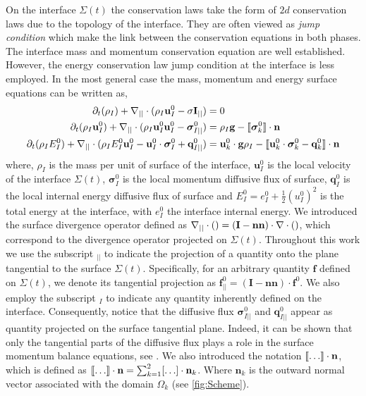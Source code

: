 On the interface $\Sigma(t)$ the conservation laws take the form of $2d$ conservation laws due to the topology of the interface. 
They are often viewed as \textit{jump condition} which make the link between the conservation equations in both phases. 
The interface mass and momentum conservation equation are well established.
However, the energy conservation law jump condition at the interface is less employed.
In the most general case the mass, momentum and energy surface equations can be written as\citep{morel2015mathematical}, 
\begin{align}
    \label{eq:dt_rhoI}
    \partial_t (\rho_I)  
    + \mathbf{\nabla}_{||}\cdot (
    \rho_I\textbf{u}_I^0
    -\sigma \textbf{I}_{||} )
    &= 
    0
    \\
    \label{eq:dt_rhoIu_I}
    \partial_t (\rho_I\textbf{u}_I^0)  
    + \mathbf{\nabla}_{||}\cdot (
    \rho_I\textbf{u}_I^0\textbf{u}_I^0
    - \bm{\sigma}_{I||}^0)
    &= 
    \rho_I \textbf{g}
    - \llbracket 
        \bm\sigma^0_k
     \rrbracket \cdot \textbf{n}\\
    \label{eq:dt_rhoIE_I}
    \partial_t (\rho_IE_I^0)  
    + \mathbf{\nabla}_{||}\cdot (
        \rho_IE_I^0\textbf{u}_I^0
        - \textbf{u}_I^0 \cdot \bm{\sigma}_I^0 
        + \textbf{q}_{I||}^0
        )
    &= 
    \textbf{u}_k^0 \cdot \textbf{g}  \rho_I
    - \llbracket \textbf{u}_k^0 \cdot \bm{\sigma}_k^0 - \textbf{q}_k^0 \rrbracket \cdot \textbf{n}
\end{align} 
where, $\rho_I$ is the mass per unit of surface of the interface, $\textbf{u}_I^0$ is the local velocity of the interface $\Sigma(t)$, $\bm{\sigma}_I^0$ is the local momentum diffusive flux of surface, $\textbf{q}_I^0$ is the local internal energy diffusive flux of surface and $E_I^0 = e_I^0 + \frac{1}{2}(u_I^0)^2$ is the total energy at the interface, with $e_I^0$ the interface internal energy. 
We introduced the surface divergence operator defined as $\mathbf{\nabla}_{||}\cdot ()= (\textbf{I}-\textbf{nn})\cdot \mathbf{\nabla}\cdot ()$, which correspond to the divergence operator projected on $\Sigma(t)$. 
Throughout this work we use the subscript  $_{||}$ to indicate the projection of a quantity onto the plane tangential to the surface $\Sigma(t)$. 
Specifically, for an arbitrary quantity $\textbf{f}$ defined on $\Sigma(t)$, we denote its tangential projection as $\textbf{f}_{||}^0 = (\textbf{I}-\textbf{nn})\cdot \textbf{f}^0$. 
We also employ the subscript $_I$ to indicate any quantity inherently defined on the interface. 
Consequently, notice that the diffusive flux $\bm{\sigma}_{I||}^0$ and $\textbf{q}_{I||}^0$ appear as quantity projected on the surface tangential plane.
Indeed, it can be shown that only the tangential parts of the diffusive flux plays a role in the surface momentum balance equations, see \citet{slattery2007interfacial}.
We also introduced the notation $\llbracket \ldots \rrbracket \cdot \textbf{n}$, which is defined as $\llbracket \ldots \rrbracket \cdot \textbf{n} = \sum_{k=1}^2 [\ldots] \cdot \textbf{n}_k$.
Where $\textbf{n}_k$ is the outward normal vector associated with the domain $\Omega_k$ (see \ref{fig:Scheme}).

